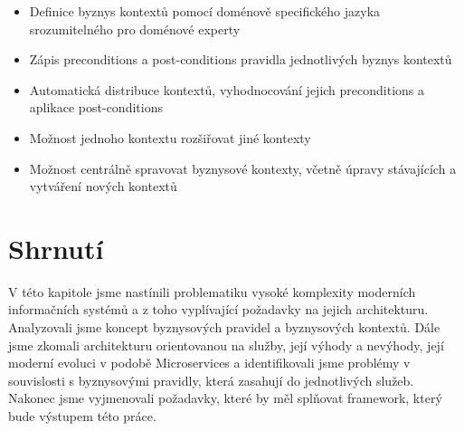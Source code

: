 \begin{itemize}
    \item{Definice byznys kontextů pomocí doménově specifického jazyka srozumitelného pro doménové experty}
    \item{Zápis preconditions a post-conditions pravidla jednotlivých byznys kontextů}
    \item{Automatická distribuce kontextů, vyhodnocování jejich preconditions a aplikace post-conditions}
    \item{Možnost jednoho kontextu rozšiřovat jiné kontexty}
    \item{Možnost centrálně spravovat byznysové kontexty, včetně úpravy stávajících a vytváření nových kontextů}
\end{itemize}

\section{Shrnutí}

V této kapitole jsme nastínili problematiku vysoké komplexity moderních informačních systémů
a z toho vyplívající požadavky na jejich architekturu. Analyzovali jsme koncept byznysových
pravidel a byznysových kontextů. Dále jsme zkomali architekturu orientovanou na služby, její
výhody a nevýhody, její moderní evoluci v podobě Microservices a identifikovali jsme problémy
v souvislosti s byznysovými pravidly, která zasahují do jednotlivých služeb. Nakonec jsme
vyjmenovali požadavky, které by měl splňovat framework, který bude výstupem této práce.
